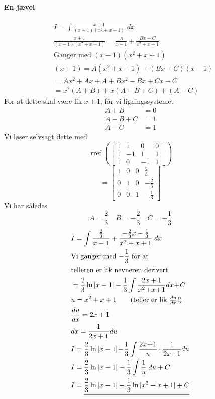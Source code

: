 \documentclass[defaultpackages]{cheatsheet}
\DeclareMathOperator{\rref}{rref}
\def\doubleunderline#1{\underline{\underline{#1}}}
\begin{document}
	\paragraph{En jævel}
	\begin{align*}
		& I = \int \frac{x+1}{(x-1)(x^2+x+1)}\;dx\\
		& \frac{x+1}{(x\!-\!1)(x^2\!+\!x\!+\!1)}\!=\!\frac{A}{x\!-\!1}+\frac{Bx+C}{x^2\!+\!x\!+\!1}\\
		& \text{Ganger med $(x-1)(x^2+x+1)$}\\
		& (x\!+\!1)\!=\!A(x^2\!+\!x\!+\!1)\!+\!(Bx+C)(x\!-\!1)\\
		&=Ax^2\!+\!Ax\!+\!A\!+\!Bx^2\!-\!Bx\!+\!Cx\!-\!C\\
		&=x^2(A\!+\!B)+x(A\!-\!B\!+\!C)+(\!A-\!C)
	\end{align*}
	For at dette skal være lik $x+1$, får vi ligningssystemet
	\begin{align*}
		A+B &= 0 \\ 
		A-B+C &= 1 \\ 
		A-C &= 1
	  \end{align*}
	  Vi løser selvsagt dette med
	  \[
		  \rref\left(
	  \begin{bmatrix}
		  1&1&0&0\\
		  1&-1&1&1\\
		  1&0&-1&1
	  \end{bmatrix}
		  \right) \]
		  \vspace{1em}
		  \[= \begin{bmatrix}
			  1&0&0&\frac{2}{3}\\
			  0&1&0&-\frac{2}{3}\\
			  0&0&1&-\frac{1}{3}
		  \end{bmatrix}
	  \]
	  Vi har således\[
		  A=\frac{2}{3}\quad  B=-\frac{2}{3}\quad C=-\frac{1}{3}
	  \]
		  \begin{align*}
			  &I=\int\frac{\frac{2}{3}}{x-1}+\frac{-\frac{2}{3}x-\frac{1}{3}}{x^2+x+1}\;dx\\
			  &\text{Vi ganger med $-\frac{1}{3}$ for at}\\
			  &\text{telleren er lik nevneren derivert}\\
			  &= \frac{2}{3}\ln|x-1|-\frac{1}{3}\int \frac{2x+1}{x^2\!+\!x\!+\!1}dx\!+\!C\\
			  & u = x^2+x+1\tag{teller er lik $\frac{du}{dx}$!}\\
			  & \frac{du}{dx} = 2x+1\\
			  & dx = \frac{1}{2x+1}du\\
			  &I = \frac{2}{3}\ln |x-1|\!-\!\frac{1}{3}\int \frac{2x\!+\!1}{u}\cdot\frac{1}{2x\!+\!1}du\\
			  &I = \frac{2}{3}\ln|x-1|-\frac{1}{3}\int \frac{1}{u}\;du+C\\
			  &I = \doubleunderline{\frac{2}{3} \ln |x-1| -\frac{1}{3}\ln|x^2+x+1|+C}
		  \end{align*}
\end{document}
